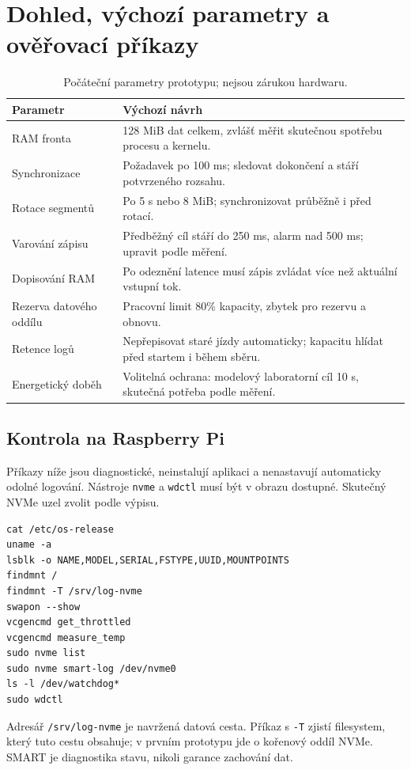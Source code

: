 \documentclass[11pt,a4paper]{article}
\begin{document}
\section{Dohled, výchozí parametry a ověřovací příkazy}
\begin{table}[htbp]\centering\small
\caption{Počáteční parametry prototypu; nejsou zárukou hardwaru.}
\begin{tabularx}{\textwidth}{L{45mm}Y}\toprule
Parametr & Výchozí návrh\\\midrule
RAM fronta & 128 MiB dat celkem, zvlášť měřit skutečnou spotřebu procesu a kernelu.\\
Synchronizace & Požadavek po 100 ms; sledovat dokončení a stáří potvrzeného rozsahu.\\
Rotace segmentů & Po 5 s nebo 8 MiB; synchronizovat průběžně i před rotací.\\
Varování zápisu & Předběžný cíl stáří do 250 ms, alarm nad 500 ms; upravit podle měření.\\
Dopisování RAM & Po odeznění latence musí zápis zvládat více než aktuální vstupní tok.\\
Rezerva datového oddílu & Pracovní limit 80\% kapacity, zbytek pro rezervu a obnovu.\\
Retence logů & Nepřepisovat staré jízdy automaticky; kapacitu hlídat před startem i během sběru.\\
Energetický doběh & Volitelná ochrana: modelový laboratorní cíl 10 s, skutečná potřeba podle měření.\\
\bottomrule\end{tabularx}\end{table}

\subsection{Kontrola na Raspberry Pi}
Příkazy níže jsou diagnostické, neinstalují aplikaci a nenastavují automaticky odolné logování. Nástroje \texttt{nvme} a \texttt{wdctl} musí být v obrazu dostupné. Skutečný NVMe uzel zvolit podle výpisu.
\begin{verbatim}
cat /etc/os-release
uname -a
lsblk -o NAME,MODEL,SERIAL,FSTYPE,UUID,MOUNTPOINTS
findmnt /
findmnt -T /srv/log-nvme
swapon --show
vcgencmd get_throttled
vcgencmd measure_temp
sudo nvme list
sudo nvme smart-log /dev/nvme0
ls -l /dev/watchdog*
sudo wdctl
\end{verbatim}
Adresář \texttt{/srv/log-nvme} je navržená datová cesta. Příkaz s \texttt{-T} zjistí filesystem, který tuto cestu obsahuje; v prvním prototypu jde o kořenový oddíl NVMe. SMART je diagnostika stavu, nikoli garance zachování dat.
\end{document}
